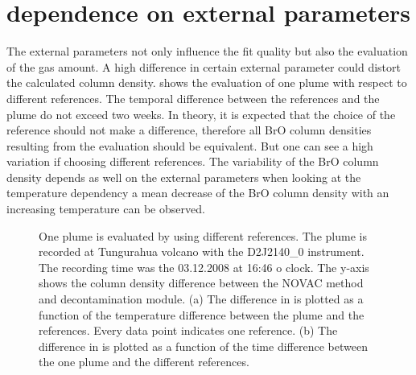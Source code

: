 \documentclass  [
  paper    = a4,
  BCOR     = 10mm,
  twoside,
  fontsize = 12pt,
  fleqn,
  toc      = bibnumbered,
  toc      = listofnumbered,
  numbers  = noendperiod,
  headings = normal,
  listof   = leveldown,
  version  = 3.03
]                                       {scrreprt}
\begin{document}
\section{  dependence on external parameters\label{Chap:BrOdep}}
The external parameters not only influence the fit quality but also the evaluation of the gas amount. A high difference in certain external parameter could distort the calculated   column density.  shows the evaluation of one plume with respect to different references. The temporal difference between the references and the plume do not exceed two weeks. In theory, it is expected that the choice of the reference should not make a difference, therefore all BrO column densities resulting from the evaluation should be equivalent. But one can see a high variation if choosing different references. The variability of the BrO column density depends as well on the external parameters when looking at the temperature dependency a mean decrease of the BrO column density with an increasing temperature can be observed.
\begin{figure}
	\caption[One plume is evaluated by using different references.  The y-axis shows the  SCD difference between the NOVAC routine and decontamination module. (a) The difference in   as a function of the temperature difference. (b) The difference in  as a function of the time difference between the one plume and the different references.]{One plume is evaluated by using different references. The plume is recorded at Tungurahua volcano with the D2J2140\_0 instrument. The recording time was the  03.12.2008  at 16:46 o clock. The y-axis shows the   column density difference between the NOVAC method and decontamination module. (a) The difference in   is plotted as a function of the temperature difference between the plume and the references. Every data point indicates one reference. (b) The difference in   is plotted as a function of the time difference between the one plume and the different references.}
	\label{fig:d2j2140060218difftemperature-cbro}        
\end{figure}
\end{document}

